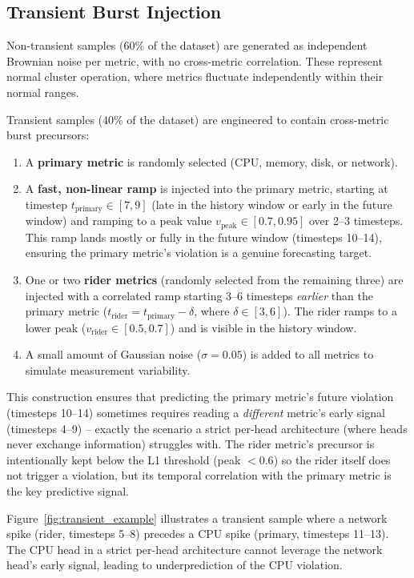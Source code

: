 \subsection{Transient Burst Injection}
\label{subsec:transient}

Non-transient samples (60\% of the dataset) are generated as independent Brownian noise per metric, with no cross-metric correlation. These represent normal cluster operation, where metrics fluctuate independently within their normal ranges.

Transient samples (40\% of the dataset) are engineered to contain cross-metric burst precursors:
\begin{enumerate}
  \item A \textbf{primary metric} is randomly selected (CPU, memory, disk, or network).
  \item A \textbf{fast, non-linear ramp} is injected into the primary metric, starting at timestep $t_{\text{primary}} \in [7, 9]$ (late in the history window or early in the future window) and ramping to a peak value $v_{\text{peak}} \in [0.7, 0.95]$ over 2--3 timesteps. This ramp lands mostly or fully in the future window (timesteps 10--14), ensuring the primary metric's violation is a genuine forecasting target.
  \item One or two \textbf{rider metrics} (randomly selected from the remaining three) are injected with a correlated ramp starting 3--6 timesteps \emph{earlier} than the primary metric ($t_{\text{rider}} = t_{\text{primary}} - \delta$, where $\delta \in [3, 6]$). The rider ramps to a lower peak ($v_{\text{rider}} \in [0.5, 0.7]$) and is visible in the history window.
  \item A small amount of Gaussian noise ($\sigma = 0.05$) is added to all metrics to simulate measurement variability.
\end{enumerate}

This construction ensures that predicting the primary metric's future violation (timesteps 10--14) sometimes requires reading a \emph{different} metric's early signal (timesteps 4--9) -- exactly the scenario a strict per-head architecture (where heads never exchange information) struggles with. The rider metric's precursor is intentionally kept below the L1 threshold (peak $< 0.6$) so the rider itself does not trigger a violation, but its temporal correlation with the primary metric is the key predictive signal.

Figure~\ref{fig:transient_example} illustrates a transient sample where a network spike (rider, timesteps 5--8) precedes a CPU spike (primary, timesteps 11--13). The CPU head in a strict per-head architecture cannot leverage the network head's early signal, leading to underprediction of the CPU violation.

